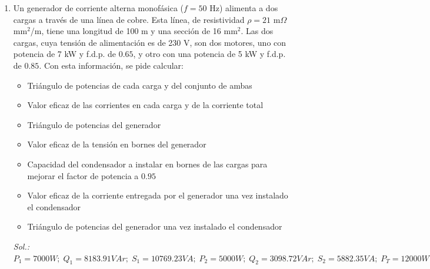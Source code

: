 \begin{enumerate}
\item Un generador de corriente alterna monofásica ($f=50$ Hz)
  alimenta a dos cargas a través de una línea de cobre. Esta línea, de
  resistividad $\rho=21$ m$\Omega$ mm$^2$/m, tiene una longitud de 100
  m y una sección de 16 mm$^2$. Las dos cargas, cuya tensión de
  alimentación es de 230 V, son dos motores, uno con potencia de 7 kW
  y f.d.p. de $0.65$, y otro con una potencia de 5 kW y f.d.p. de
  $0.85$. Con esta información, se pide calcular:
  \begin{itemize}
  \item Triángulo de potencias de cada carga y del conjunto de ambas
  \item Valor eficaz de las corrientes en cada carga y de la corriente
    total
  \item Triángulo de potencias del generador
  \item Valor eficaz de la tensión en bornes del generador
  \item Capacidad del condensador a instalar en bornes de las cargas
    para mejorar el factor de potencia a $0.95$
  \item Valor eficaz de la corriente entregada por el generador una
    vez instalado el condensador
  \item Triángulo de potencias del generador una vez instalado el
    condensador
  \end{itemize}
  \emph{Sol.:
    $P_1=7000W;\;
    Q_1=8183.91VAr;\;S_1=10769.23VA;\;P_2=5000W;\;Q_2=3098.72VAr;\;S_2=5882.35VA;\;P_T=12000W;\;Q_T=11282.63VAr;\;S_T=16471.12VA;\,
    I_1=46.82\,A;\;I_2=25.58\,A;\;I_T=71.62\,A;\,P_g=13346.23W;\;Q_g=11282.63 VAr;\,S_g=17476.26 VA;\;U_g=244.4 V;\; C=441.66
    \mu F;\,I'=54.92 A;\;P_g'=12791.75 W;\;Q_g'=3944.21
    VAr;\;S_g'=13386.02 VA$}


\end{enumerate}
